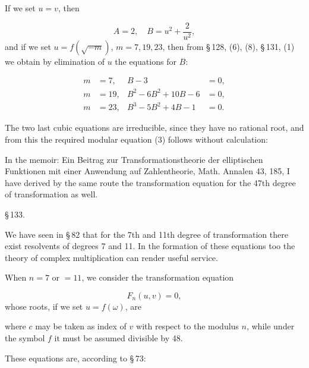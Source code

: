 
If we set $u = v$, then

\[
A = 2, \quad B = u^2 + \frac{2}{u^2},
\]
and if we set $u = f(\sqrt{-m})$, $m = 7, 19, 23$, then from \S\,128, (6), (8), \S\,131, (1) we obtain by elimination of $u$ the equations for $B$:

\[
\begin{aligned}
m &= 7, & B - 3 &= 0, \\
m &= 19, & B^2 - 6B^2 + 10B - 6 &= 0, \\ %
m &= 23, & B^3 - 5B^2 + 4B - 1 &= 0.
\end{aligned}
\]

The two last cubic equations are irreducible, since they have no rational root, and from this the required modular equation (3) follows without calculation:


In the memoir: \glqq Ein Beitrag zur Transformationstheorie der elliptischen Funktionen mit einer Anwendung auf Zahlentheorie\grqq{}, Math. Annalen 43, 185, I have derived by the same route the transformation equation for the 47th degree of transformation as well.

\begin{center}
\S\,133. 
\end{center}

We have seen in \S\,82 that for the 7th and 11th degree of transformation there exist resolvents of degrees 7 and 11. In the formation of these equations too the theory of complex multiplication can render useful service.

When $n = 7$ or $= 11$, we consider the transformation equation

\[
F_n(u, v) = 0,
\]
whose roots, if we set $u = f(\omega)$, are


where $c$ may be taken as index of $v$ with respect to the modulus $n$, while under the symbol $f$ it must be assumed divisible by 48.

These equations are, according to \S\,73:


